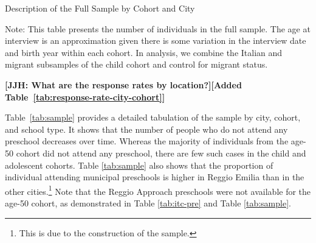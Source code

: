 \begin{table}[H]
\centering
\begin{threeparttable}
	\caption{Description of the Full Sample by Cohort and City}\label{tab:sample-city-cohort}
	
\begin{tablenotes}
\footnotesize
Note: This table presents the number of individuals in the full sample. The age at interview is an approximation given there is some variation in the interview date and birth year within each cohort. In analysis, we combine the Italian and migrant subsamples of the child cohort and control for migrant status.
\end{tablenotes}
\end{threeparttable}
\end{table}

\textbf{[JJH: What are the response rates by location?]}\textbf{[Added Table~\ref{tab:response-rate-city-cohort}]}

Table~\ref{tab:sample} provides a detailed tabulation of the sample by city, cohort, and school type. It shows that the number of people who do not attend any preschool decreases over time. Whereas the majority of individuals from the age-50 cohort did not attend any preschool, there are few such cases in the child and adolescent cohorts. Table \ref{tab:sample} also shows that the proportion of individual attending municipal preschools is higher in Reggio Emilia than in the other cities.\footnote{This is due to the construction of the sample.} Note that the Reggio Approach preschools were not available for the age-50 cohort, as demonstrated in Table \ref{tab:itc-pre} and Table \ref{tab:sample}.

\begin{table}[H]
\centering
{}
\end{table}

